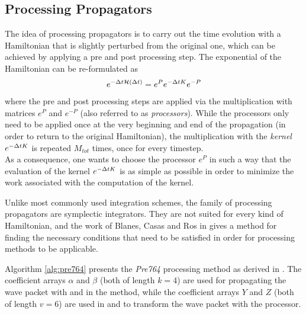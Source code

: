 \subsection{Processing Propagators}
\label{sub:pre764_propagator}
%
The idea of processing propagators is to carry out the time evolution with a Hamiltonian that is slightly perturbed from the original one, which can be achieved by applying a pre and post processing step.
The exponential of the Hamiltonian can be re-formulated as
%
\begin{align}
	e^{- \Delta t \mathcal{H} (\Delta t)} = e^P e^{- \Delta t K} e^{-P}
\end{align}
%
where the pre and post processing steps are applied via the multiplication with matrices $e^P$ and $e^{-P}$ (also referred to as \emph{processors}).
While the processors only need to be applied once at the very beginning and end of the propagation (in order to return to the original Hamiltonian), the multiplication with the \emph{kernel} $e^{-\Delta t K}$ is repeated $M_{tot}$ times, once for every timestep. \\
As a consequence, one wants to choose the processor $e^P$ in such a way that the evaluation of the kernel $e^{-\Delta t K}$ is as simple as possible in order to minimize the work associated with the computation of the kernel.
\par\medskip
%
Unlike most commonly used integration schemes, the family of processing propagators are symplectic integrators.
They are not suited for every kind of Hamiltonian, and the work of Blanes, Casas and Ros in \cite{Blanes1999} gives a method for finding the  necessary conditions that need to be satisfied in order for processing methods to be applicable.
\par\medskip
%
Algorithm \ref{alg:pre764} presents the \emph{Pre764} processing method as derived in \cite{Blanes1999}.
The coefficient arrays $\alpha$ and $\beta$ (both of length $k=4$) are used for propagating the wave packet with  and  in the  method, while the coefficient arrays $Y$ and $Z$ (both of length $v=6$) are used in  and  to transform the wave packet with the processor.
%
